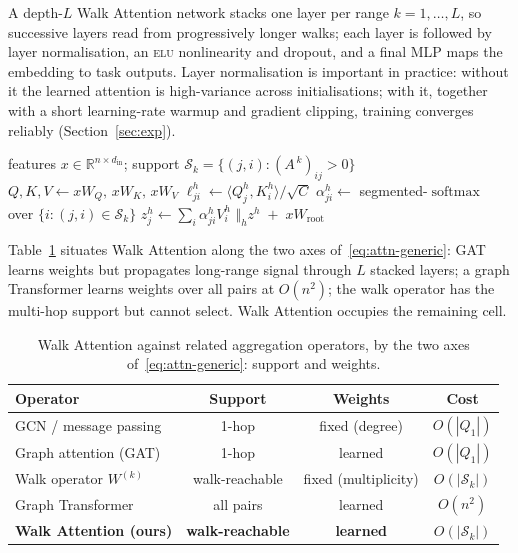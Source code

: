 \documentclass[runningheads]{llncs}
\newcommand{\RR}{\mathbb{R}}
\newcommand{\Adj}{A}
\DeclareMathOperator{\softmax}{softmax}
\begin{document}
A depth-$L$ Walk Attention network stacks one layer per range $k=1,\dots,L$, so
successive layers read from progressively longer walks; each layer is followed
by layer normalisation, an \textsc{elu} nonlinearity and dropout, and a final
MLP maps the embedding to task outputs. Layer normalisation is important in
practice: without it the learned attention is high-variance across
initialisations; with it, together with a short learning-rate warmup and
gradient clipping, training converges reliably (Section~\ref{sec:exp}).

\begin{algorithm}[t]
\caption{Walk Attention layer at range $k$ (sparse).}\label{alg:wa}
\begin{algorithmic}[1]
\Require features $x\in\RR^{n\times d_{\text{in}}}$; support
  $\mathcal{S}_k=\{(j,i):(\Adj^{\,k})_{ij}>0\}$
\State $Q,K,V \gets xW_Q,\,xW_K,\,xW_V$ 
  \State $\ell^h_{ji}\gets \langle Q^h_j,K^h_i\rangle/\sqrt{C}$
\EndFor
\State $\alpha^h_{ji}\gets$ segmented-$\softmax$ over $\{i:(j,i)\in\mathcal{S}_k\}$
\State $z^h_j\gets \sum_i \alpha^h_{ji}V^h_i$ 
\State \Return $\bigl\Vert_h z^h \;+\; xW_{\!\text{root}}$
\end{algorithmic}
\end{algorithm}

Table~\ref{tab:relation} situates Walk Attention along the two axes
of~\eqref{eq:attn-generic}: GAT learns weights but propagates long-range
signal through $L$ stacked layers; a graph Transformer learns weights over all
pairs at $O(n^2)$; the walk operator has the multi-hop support but cannot
select. Walk Attention occupies the remaining cell.

\begin{table}[t]
\centering
\caption{Walk Attention against related aggregation operators, by the two axes
of~\eqref{eq:attn-generic}: support and weights.}
\label{tab:relation}
\begin{tabular}{lccc}
\toprule
\textbf{Operator} & \textbf{Support} & \textbf{Weights} & \textbf{Cost} \\
\midrule
GCN / message passing       & 1-hop      & fixed (degree) & $O(|Q_1|)$ \\
Graph attention (GAT)       & 1-hop      & learned        & $O(|Q_1|)$ \\
Walk operator $W^{(k)}$     & walk-reachable & fixed (multiplicity) & $O(|\mathcal{S}_k|)$ \\
Graph Transformer           & all pairs  & learned        & $O(n^2)$ \\
\textbf{Walk Attention (ours)} & \textbf{walk-reachable} & \textbf{learned} & $O(|\mathcal{S}_k|)$ \\
\bottomrule
\end{tabular}
\end{table}
\end{document}
